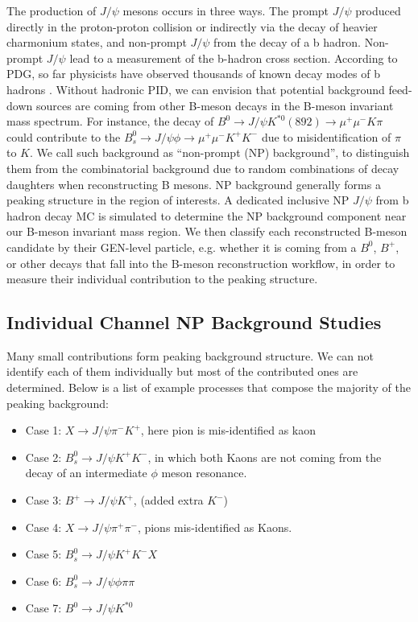 The production of $J/\psi$ mesons occurs in three ways. The prompt $J/\psi$ produced directly in the proton-proton collision or indirectly via the decay of heavier charmonium states, and non-prompt $J/\psi$ from the decay of a b hadron. Non-prompt $J/\psi$ lead to a measurement of the b-hadron cross section. According to PDG, so far physicists have observed thousands of known decay modes of b hadrons \cite{AlphaTheoEx}. Without hadronic PID, we can envision that potential background feed-down sources are coming from other B-meson decays in the B-meson invariant mass spectrum. For instance, the decay of $B^0 \rightarrow J/\psi K^{*0} (892) \rightarrow \mu^+ \mu^- K\pi$ could contribute to the $B^0_s \rightarrow J/\psi \phi \rightarrow \mu^+ \mu^- K^+ K^-$ due to misidentification of $\pi$ to $K$. We call such background as ``non-prompt (NP) background'', to distinguish them from the combinatorial background due to random combinations of decay daughters when reconstructing B mesons. NP background generally forms a peaking structure in the region of interests. A dedicated inclusive NP $J/\psi$ from b hadron decay MC is simulated to determine the NP background component near our B-meson invariant mass region. We then classify each reconstructed B-meson candidate by their GEN-level particle, e.g. whether it is coming from a $B^{0}$, $B^{+}$, or other decays that fall into the B-meson reconstruction workflow, in order to measure their individual contribution to the peaking structure.


\subsection{Individual Channel NP Background Studies} 


\label{sec:individual_channels}
Many small contributions form peaking background structure. We can not identify each of them individually but most of the contributed ones are determined.
Below is a list of example processes that compose the majority of the peaking background:

\begin{itemize}
\item {Case 1: $ X \rightarrow J/\psi  \pi^{-}  K^{+}$, here pion is mis-identified as kaon}
\item {Case 2: $ B_{s}^{0} \rightarrow J/\psi  K^+ K^- $, in which both Kaons are not coming from the decay of an intermediate $\phi$ meson resonance.}
\item {Case 3: $ B^{+} \rightarrow J/\psi  K^{+}$, (added extra $K^-$)} 
\item {Case 4: $ X \rightarrow J/\psi  \pi^{+} \pi^{-}$, pions mis-identified as Kaons. }
\item {Case 5: $ B_{s}^{0} \rightarrow J/\psi K^{+} K^{-} X $ }
\item {Case 6: $ B_{s}^{0} \rightarrow J/\psi \phi \pi \pi $}
\item {Case 7: $B^0 \rightarrow J/\psi  K^{*0} $}
\end{itemize}

